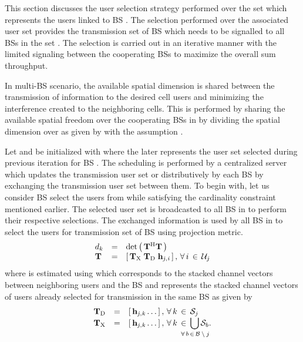 
This section discusses the user selection strategy performed over the set  which represents the users linked to BS . The selection performed over the associated user set  provides the transmission set  of BS  which needs to be signalled to all BSs in the set . The selection is carried out in an iterative manner with the limited signaling between the cooperating BSs to maximize the overall sum throughput.

In multi-BS scenario, the available spatial dimension  is shared between the transmission of information to the desired cell users and minimizing the interference created to the neighboring cells. This is performed by sharing the available spatial freedom  over the cooperating BSs in  by dividing the spatial dimension over  as given by  with the assumption .

Let  and  be initialized with  where the later represents the user set selected during previous iteration for BS . The scheduling is performed by a centralized server which updates the transmission user set or distributively by each BS by exchanging the transmission user set  between them. To begin with, let us consider BS  select the users from  while satisfying the cardinality constraint mentioned earlier. The selected user set  is broadcasted to all BS in  to perform their respective selections. The exchanged information  is used by all BS in  to select the users for transmission set  of BS  using projection metric.
\begin{equation}
\begin{array}{lcl}
d_k &=& \det \left ( \, \mathbf{T}^{\mathrm{H}} \mathbf{T} \, \right ) \\
\mathbf{T} &=& \left [ \, \mathbf{T}_{\mathrm{X}} \; \mathbf{T}_{\mathrm{D}} \; \mathbf{h}_{\mathit{j},\mathit{i}} \, \right ], \, \forall \, i \, \in \, \mathcal{U}_j
\end{array}
\label{sus-e1}
\end{equation}
where  is estimated using  which corresponds to the stacked channel vectors between neighboring users and the BS  and  represents the stacked channel vectors of users already selected for transmission in the same BS  as given by
\begin{equation}
\begin{array}{lcl}
\mbf{T}_{\mrm{D}} &=& \matscont{\mvecxyz{h}{j}{k} \dotso}, \fall k \inm \mc{S}_j \\
\mbf{T}_{\mrm{X}} &=& \matscont{\mvecxyz{h}{j}{k} \dotso }, \fall k \inm \displaystyle \bigcup_{\mathclap{\fall b \inm \mc{B} \bs j}} \mc{S}_b.
\end{array}
\label{sus-e2}
\end{equation}

